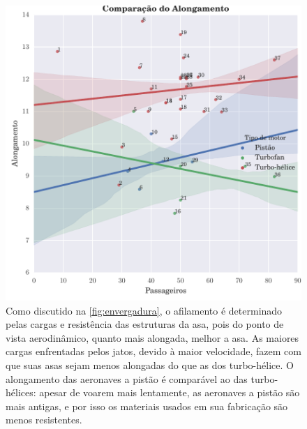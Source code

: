\begin{figure}
\centering
\includegraphics{../autogenerated/graficos_comparativos/alongamento.pdf}
\caption[Comparação do alcance]{
Como discutido na \autoref{fig:envergadura}, o afilamento é determinado pelas cargas e resistência das estruturas da asa, pois do ponto de vista aerodinâmico, quanto mais alongada, melhor a asa. As maiores cargas enfrentadas pelos jatos, devido à maior velocidade, fazem com que suas asas sejam menos alongadas do que as dos turbo-hélice. O alongamento das aeronaves a pistão é comparável ao das turbo-hélices: apesar de voarem mais lentamente, as aeronaves a pistão são mais antigas, e por isso os materiais usados em sua fabricação são menos resistentes.
}
\label{fig:alongamento}
\end{figure}

